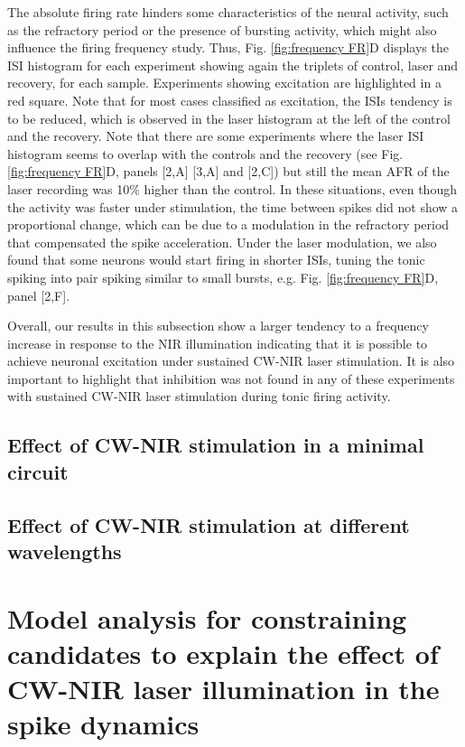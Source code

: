 The absolute firing rate hinders some characteristics of the neural activity, such as the refractory period or the presence of bursting activity, which might also influence the firing frequency study. Thus, Fig. \ref{fig:frequency FR}D displays the ISI histogram for each experiment showing again the triplets of control, laser and recovery, for each sample. Experiments showing excitation are highlighted in a red square. Note that for most cases classified as excitation, the ISIs tendency is to be reduced, which is observed in the laser histogram at the left of the control and the recovery. Note that there are some experiments where the laser ISI histogram seems to overlap with the controls and the recovery (see Fig. \ref{fig:frequency FR}D, panels [2,A] [3,A] and [2,C]) but still the mean AFR of the laser recording was 10\% higher than the control. In these situations, even though the activity was faster under stimulation, the time between spikes did not show a proportional change, which can be due to a modulation in the refractory period that compensated the spike acceleration. Under the laser modulation, we also found that some neurons would start firing in shorter ISIs, tuning the tonic spiking into pair spiking similar to small bursts, e.g. Fig. \ref{fig:frequency FR}D, panel [2,F].

Overall, our results in this subsection show a larger tendency to a frequency increase in response to the NIR illumination indicating that it is possible to achieve neuronal excitation under sustained CW-NIR laser stimulation. It is also important to highlight that inhibition was not found in any of these experiments with sustained CW-NIR laser stimulation during tonic firing activity. 


\subsection{Effect of CW-NIR stimulation in a minimal circuit}


\subsection{Effect of CW-NIR stimulation at different wavelengths}
\section{Model analysis for constraining candidates to explain the effect of CW-NIR laser illumination in the spike dynamics}
\label{sect:models}

